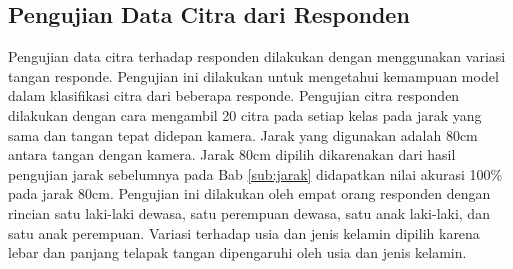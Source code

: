 \subsection{Pengujian Data Citra dari Responden}
Pengujian data citra terhadap responden dilakukan dengan menggunakan variasi tangan responde. Pengujian ini dilakukan untuk mengetahui kemampuan model dalam klasifikasi citra dari beberapa responde. Pengujian citra responden dilakukan dengan cara mengambil 20 citra pada setiap kelas pada jarak yang sama dan tangan tepat didepan kamera. Jarak yang digunakan adalah 80cm antara tangan dengan kamera. Jarak 80cm dipilih dikarenakan dari hasil pengujian jarak sebelumnya pada Bab \ref{sub:jarak} didapatkan nilai akurasi 100\% pada jarak 80cm. Pengujian ini dilakukan oleh empat orang responden dengan rincian satu laki-laki dewasa, satu perempuan dewasa, satu anak laki-laki, dan satu anak perempuan. Variasi terhadap usia dan jenis kelamin dipilih karena lebar dan panjang telapak tangan dipengaruhi oleh usia dan jenis kelamin. 
